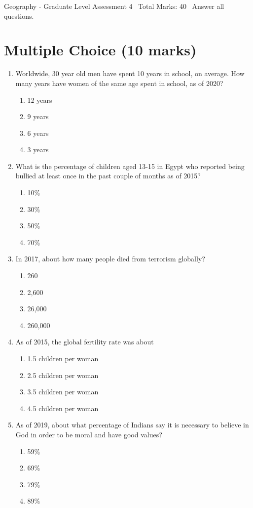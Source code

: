 \documentclass[12pt]{article}
\begin{document}
\begin{center}
Geography - Graduate Level Assessment 4 \
Total Marks: 40 \
Answer all questions.
\end{center}

\section*{Multiple Choice (10 marks)}
\begin{enumerate}[label=\arabic*.]
\item Worldwide, 30 year old men have spent 10 years in school, on average. How many years have women of the same age spent in school, as of 2020?
\begin{enumerate}[label=(\alph*)]
    \item 12 years
    \item 9 years
    \item 6 years
    \item 3 years
\end{enumerate}
\item What is the percentage of children aged 13-15 in Egypt who reported being bullied at least once in the past couple of months as of 2015?
\begin{enumerate}[label=(\alph*)]
    \item 10\%
    \item 30\%
    \item 50\%
    \item 70\%
\end{enumerate}
\item In 2017, about how many people died from terrorism globally?
\begin{enumerate}[label=(\alph*)]
    \item 260
    \item 2,600
    \item 26,000
    \item 260,000
\end{enumerate}
\item As of 2015, the global fertility rate was about
\begin{enumerate}[label=(\alph*)]
    \item 1.5 children per woman
    \item 2.5 children per woman
    \item 3.5 children per woman
    \item 4.5 children per woman
\end{enumerate}
\item As of 2019, about what percentage of Indians say it is necessary to believe in God in order to be moral and have good values?
\begin{enumerate}[label=(\alph*)]
    \item 59\%
    \item 69\%
    \item 79\%
    \item 89\%
\end{enumerate}
\end{enumerate}
\end{document}
